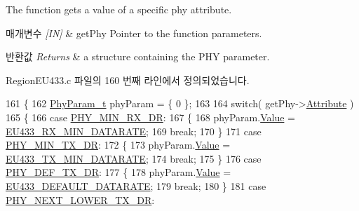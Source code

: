 The function gets a value of a specific phy attribute. 


\begin{DoxyParams}{매개변수}
{\em \mbox{[}\+I\+N\mbox{]}} & get\+Phy Pointer to the function parameters.\\
\hline
\end{DoxyParams}

\begin{DoxyRetVals}{반환값}
{\em Returns} & a structure containing the P\+HY parameter. \\
\hline
\end{DoxyRetVals}


Region\+E\+U433.\+c 파일의 160 번째 라인에서 정의되었습니다.


\begin{DoxyCode}
161 \{
162     \mbox{\hyperlink{unionu_phy_param}{PhyParam\_t}} phyParam = \{ 0 \};
163 
164     \textcolor{keywordflow}{switch}( getPhy->\mbox{\hyperlink{structs_get_phy_params_abdcb168ffd6913b85e2f635d7a475f2d}{Attribute}} )
165     \{
166         \textcolor{keywordflow}{case} \mbox{\hyperlink{group___r_e_g_i_o_n_gga51cbe8f5433d914fe9cf81b451de2c2da91cb5d84f937c32cd635dd7efe7a9d3a}{PHY\_MIN\_RX\_DR}}:
167         \{
168             phyParam.\mbox{\hyperlink{unionu_phy_param_a8e0dcce3428a8051614e852b8836d0d1}{Value}} = \mbox{\hyperlink{group___r_e_g_i_o_n_e_u433_ga895971124c9b602ce25f611d37df78a3}{EU433\_RX\_MIN\_DATARATE}};
169             \textcolor{keywordflow}{break};
170         \}
171         \textcolor{keywordflow}{case} \mbox{\hyperlink{group___r_e_g_i_o_n_gga51cbe8f5433d914fe9cf81b451de2c2daace3e56c88b40def8ed6a9106871e7de}{PHY\_MIN\_TX\_DR}}:
172         \{
173             phyParam.\mbox{\hyperlink{unionu_phy_param_a8e0dcce3428a8051614e852b8836d0d1}{Value}} = \mbox{\hyperlink{group___r_e_g_i_o_n_e_u433_ga800fe5b0107ad06f0938c226022b436b}{EU433\_TX\_MIN\_DATARATE}};
174             \textcolor{keywordflow}{break};
175         \}
176         \textcolor{keywordflow}{case} \mbox{\hyperlink{group___r_e_g_i_o_n_gga51cbe8f5433d914fe9cf81b451de2c2da70c3923333165960549162e3dcf10467}{PHY\_DEF\_TX\_DR}}:
177         \{
178             phyParam.\mbox{\hyperlink{unionu_phy_param_a8e0dcce3428a8051614e852b8836d0d1}{Value}} = \mbox{\hyperlink{group___r_e_g_i_o_n_e_u433_gaef579f3b753e8be08c36bd3da13a75a8}{EU433\_DEFAULT\_DATARATE}};
179             \textcolor{keywordflow}{break};
180         \}
181         \textcolor{keywordflow}{case} \mbox{\hyperlink{group___r_e_g_i_o_n_gga51cbe8f5433d914fe9cf81b451de2c2dac002e7e492cf30dbf9c544b062f5cc8a}{PHY\_NEXT\_LOWER\_TX\_DR}}:

\end{DoxyCode}
